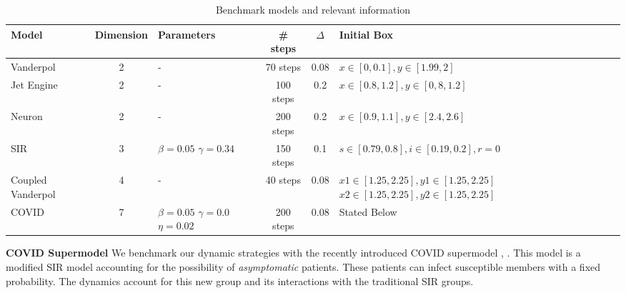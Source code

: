 \vspace{-1em}
\begin{table}[h!]
  \centering
\begin{tabular}{|p{1.5cm}|c|p{1.7cm}|c|c|p{5cm}|}
\hline
Model & Dimension & Parameters & \# steps & $\Delta$ & \hspace{1.5cm}Initial Box \\
\hline
Vanderpol & 2 & \quad \quad \; - & 70 steps & 0.08 & $x \in [0,0.1], y \in [1.99,2]$ \\
\hline
Jet Engine& 2 & \quad \quad \; - & 100 steps & 0.2 & $x \in [0.8,1.2], y \in [0,8,1.2]$ \\
\hline
Neuron \cite{fitzhugh1961impulses}& 2 & \quad \quad \; - & 200 steps & 0.2 & $x \in [0.9,1.1], y \in [2.4,2.6]$ \\
\hline
SIR& 3 & $\beta=0.05$ \newline $\gamma=0.34$ & 150 steps & 0.1 & $s \in [0.79,0.8], i \in [0.19,0.2], r = 0$ \\
\hline
Coupled \newline Vanderpol & 4 & \quad \quad \; - & 40 steps & 0.08 & $x1 \in [1.25, 2.25], y1 \in [1.25, 2.25]$ \newline $x2 \in [1.25, 2.25], y2 \in [1.25, 2.25]$ \\
\hline
COVID & 7 & $\beta=0.05$ \newline $\gamma=0.0$ \newline $\eta=0.02$ & 200 steps & 0.08 & \quad \quad \quad \; \; Stated Below\\
\hline
\end{tabular}
\caption{Benchmark models and relevant information}
\label{tab:modeldyns}
\end{table}

\vspace{-2em}
\noindent \textbf{COVID Supermodel}
%
We benchmark our dynamic strategies with the recently introduced COVID supermodel \cite{ansumali2020modelling}, \cite{indiansuper2020supermodel}. This model is a modified SIR model accounting for the possibility of \emph{asymptomatic} patients. These patients can infect susceptible members with a fixed probability. The dynamics account for this new group and its interactions with the traditional SIR groups.

